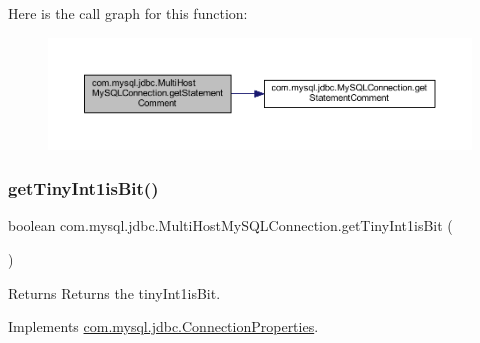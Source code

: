 Here is the call graph for this function\+:
\nopagebreak
\begin{figure}[H]
\begin{center}
\leavevmode
\includegraphics[width=350pt]{classcom_1_1mysql_1_1jdbc_1_1_multi_host_my_s_q_l_connection_a9d4bbb42860206a659b53b3d5441fac3_cgraph}
\end{center}
\end{figure}
\mbox{\label{classcom_1_1mysql_1_1jdbc_1_1_multi_host_my_s_q_l_connection_a94faebe8a08ecfceb521766576703f02}} 
\subsubsection{\texorpdfstring{get\+Tiny\+Int1is\+Bit()}{getTinyInt1isBit()}}
{\footnotesize\ttfamily boolean com.\+mysql.\+jdbc.\+Multi\+Host\+My\+S\+Q\+L\+Connection.\+get\+Tiny\+Int1is\+Bit (\begin{DoxyParamCaption}{ }\end{DoxyParamCaption})}

\begin{DoxyReturn}{Returns}
Returns the tiny\+Int1is\+Bit. 
\end{DoxyReturn}


Implements \mbox{\hyperlink{interfacecom_1_1mysql_1_1jdbc_1_1_connection_properties_a3bde53c87aba637f1e0833d504e96742}{com.\+mysql.\+jdbc.\+Connection\+Properties}}.

